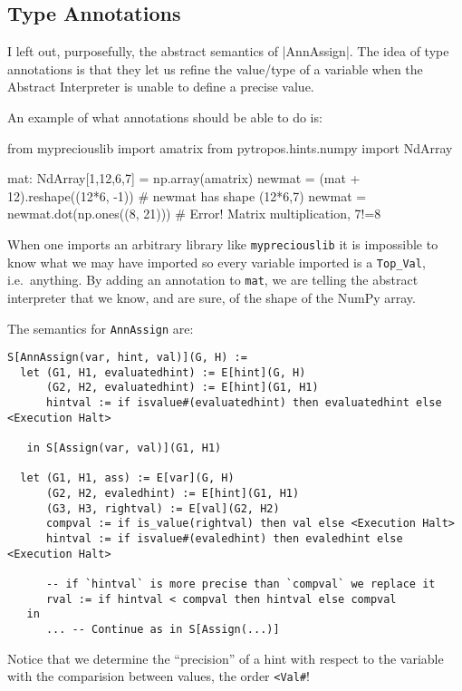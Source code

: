 \subsection{Type Annotations}\label{type-annotations}

I left out, purposefully, the abstract semantics of \pycode|AnnAssign|.
The idea of type annotations is that they let us refine the value/type
of a variable when the Abstract Interpreter is unable to define a
precise value.

An example of what annotations should be able to do is:

\begin{pythoncode}
from mypreciouslib import amatrix
from pytropos.hints.numpy import NdArray

mat: NdArray[1,12,6,7] = np.array(amatrix)
newmat = (mat + 12).reshape((12*6, -1))  # newmat has shape (12*6,7)
newmat = newmat.dot(np.ones((8, 21)))  # Error! Matrix multiplication, 7!=8
\end{pythoncode}

When one imports an arbitrary library like \texttt{mypreciouslib} it is
impossible to know what we may have imported so every variable imported
is a \texttt{Top\_Val}, i.e.~anything. By adding an annotation to
\texttt{mat}, we are telling the abstract interpreter that we know, and
are sure, of the shape of the NumPy array.

The semantics for \texttt{AnnAssign} are:

\begin{verbatim}
S[AnnAssign(var, hint, val)](G, H) :=
  let (G1, H1, evaluatedhint) := E[hint](G, H)
      (G2, H2, evaluatedhint) := E[hint](G1, H1)
      hintval := if isvalue#(evaluatedhint) then evaluatedhint else <Execution Halt>

   in S[Assign(var, val)](G1, H1)

  let (G1, H1, ass) := E[var](G, H)
      (G2, H2, evaledhint) := E[hint](G1, H1)
      (G3, H3, rightval) := E[val](G2, H2)
      compval := if is_value(rightval) then val else <Execution Halt>
      hintval := if isvalue#(evaledhint) then evaledhint else <Execution Halt>

      -- if `hintval` is more precise than `compval` we replace it
      rval := if hintval < compval then hintval else compval
   in
      ... -- Continue as in S[Assign(...)]
\end{verbatim}

Notice that we determine the \enquote{precision} of a hint with respect
to the variable with the comparision between values, the order
\texttt{\textless{}Val\#}!

